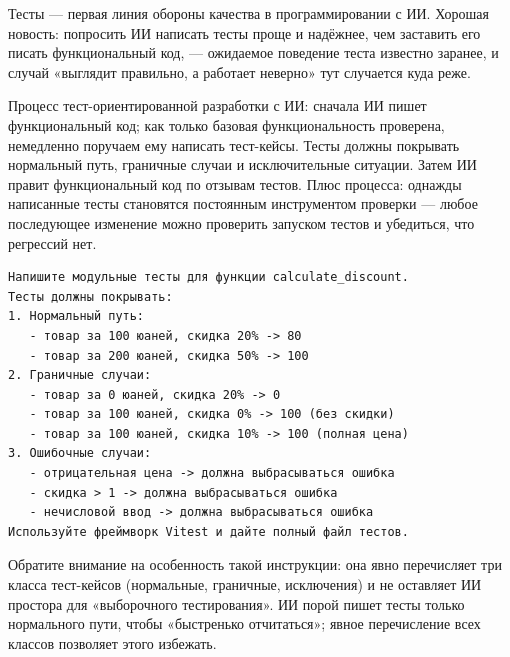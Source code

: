 


Тесты — первая линия обороны качества в программировании с ИИ. Хорошая новость: попросить ИИ написать тесты проще и надёжнее, чем заставить его писать функциональный код, — ожидаемое поведение теста известно заранее, и случай «выглядит правильно, а работает неверно» тут случается куда реже.

Процесс тест-ориентированной разработки с ИИ: сначала ИИ пишет функциональный код; как только базовая функциональность проверена, немедленно поручаем ему написать тест-кейсы. Тесты должны покрывать нормальный путь, граничные случаи и исключительные ситуации. Затем ИИ правит функциональный код по отзывам тестов. Плюс процесса: однажды написанные тесты становятся постоянным инструментом проверки — любое последующее изменение можно проверить запуском тестов и убедиться, что регрессий нет.

\begin{lstlisting}
Напишите модульные тесты для функции calculate_discount.
Тесты должны покрывать:
1. Нормальный путь:
   - товар за 100 юаней, скидка 20% -> 80
   - товар за 200 юаней, скидка 50% -> 100
2. Граничные случаи:
   - товар за 0 юаней, скидка 20% -> 0
   - товар за 100 юаней, скидка 0% -> 100 (без скидки)
   - товар за 100 юаней, скидка 10% -> 100 (полная цена)
3. Ошибочные случаи:
   - отрицательная цена -> должна выбрасываться ошибка
   - скидка > 1 -> должна выбрасываться ошибка
   - нечисловой ввод -> должна выбрасываться ошибка
Используйте фреймворк Vitest и дайте полный файл тестов.
\end{lstlisting}

Обратите внимание на особенность такой инструкции: она явно перечисляет три класса тест-кейсов (нормальные, граничные, исключения) и не оставляет ИИ простора для «выборочного тестирования». ИИ порой пишет тесты только нормального пути, чтобы «быстренько отчитаться»; явное перечисление всех классов позволяет этого избежать.

